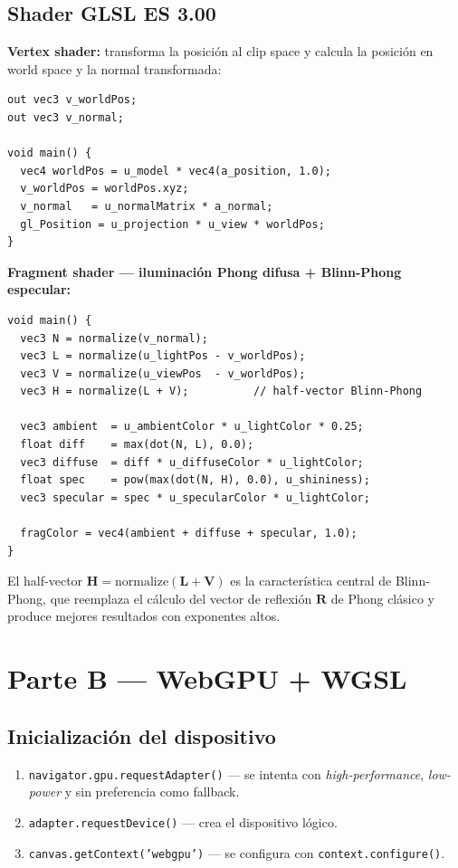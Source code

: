 \documentclass[12pt,a4paper]{article}
\begin{document}
\subsection{Shader GLSL ES 3.00}

\textbf{Vertex shader:} transforma la posición al clip space y calcula la posición en world space y la normal transformada:

\begin{lstlisting}[style=glsl, language={}]
out vec3 v_worldPos;
out vec3 v_normal;

void main() {
  vec4 worldPos = u_model * vec4(a_position, 1.0);
  v_worldPos = worldPos.xyz;
  v_normal   = u_normalMatrix * a_normal;
  gl_Position = u_projection * u_view * worldPos;
}
\end{lstlisting}

\textbf{Fragment shader — iluminación Phong difusa + Blinn-Phong especular:}

\begin{lstlisting}[style=glsl, language={}]
void main() {
  vec3 N = normalize(v_normal);
  vec3 L = normalize(u_lightPos - v_worldPos);
  vec3 V = normalize(u_viewPos  - v_worldPos);
  vec3 H = normalize(L + V);          // half-vector Blinn-Phong

  vec3 ambient  = u_ambientColor * u_lightColor * 0.25;
  float diff    = max(dot(N, L), 0.0);
  vec3 diffuse  = diff * u_diffuseColor * u_lightColor;
  float spec    = pow(max(dot(N, H), 0.0), u_shininess);
  vec3 specular = spec * u_specularColor * u_lightColor;

  fragColor = vec4(ambient + diffuse + specular, 1.0);
}
\end{lstlisting}

El half-vector $\mathbf{H} = \text{normalize}(\mathbf{L} + \mathbf{V})$ es la característica central de Blinn-Phong, que reemplaza el cálculo del vector de reflexión $\mathbf{R}$ de Phong clásico y produce mejores resultados con exponentes altos.

\section{Parte B — WebGPU + WGSL}

\subsection{Inicialización del dispositivo}

\begin{enumerate}[leftmargin=*]
  \item \texttt{navigator.gpu.requestAdapter()} — se intenta con \textit{high-performance}, \textit{low-power} y sin preferencia como fallback.
  \item \texttt{adapter.requestDevice()} — crea el dispositivo lógico.
  \item \texttt{canvas.getContext('webgpu')} — se configura con \texttt{context.configure()}.
\end{enumerate}
\end{document}
